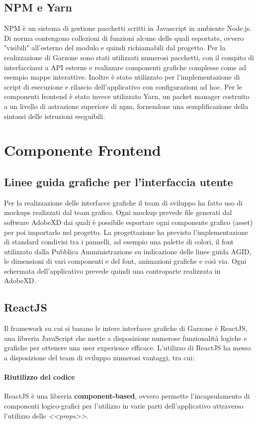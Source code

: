 \subsection{NPM e Yarn}
NPM è un sistema di gestione pacchetti scritti in Javascript in ambiente Node.js. Di norma contengono collezioni di funzioni alcune delle quali esportate, ovvero "visibili" all'esterno del modulo e quindi richiamabili dal progetto. Per la realizzazione di Garzone sono stati utilizzati numerosi pacchetti, con il compito di interfacciarsi a API esterne e realizzare componenti grafiche complesse come ad esempio mappe interattive. Inoltre è stato utilizzato per l'implementazione di script di esecuzione e rilascio dell'applicativo con configurazioni ad hoc. Per le componenti frontend è stato invece utilizzato Yarn, un packet manager costruito a un livello di astrazione superiore di npm, fornendone una semplificazione della sintassi delle istruzioni eseguibili.
\newpage
\section{Componente Frontend}
\subsection{Linee guida grafiche per l'interfaccia utente}
Per la realizzazione delle interfacce grafiche il team di sviluppo ha fatto uso di mockups realizzati dal team grafico. Ogni mockup prevede file generati dal software AdobeXD dai quali è possibile esportare ogni componente grafico (asset) per poi importarlo nel progetto. La progettazione ha previsto l'implementazione di standard condivisi tra i pannelli, ad esempio una palette di colori, il font utilizzato dalla Pubblica Amministrazione su indicazione delle linee guida AGID, le dimensioni di vari componenti e del font, animazioni grafiche e così via. Ogni schermata dell'applicativo prevede quindi una controparte realizzata in AdobeXD.
\subsection{ReactJS}
Il framework su cui si basano le intere interfacce grafiche di Garzone è ReactJS, una libreria JavaScript che mette a disposizione numerose funzionalità logiche e grafiche per ottenere una user experience efficace. L'utilizzo di ReactJS ha messo a disposizione del team di sviluppo numerosi vantaggi, tra cui:
\paragraph{Riutilizzo del codice} ReactJS è una libreria \textbf{component-based}, ovvero permette l'incapsulamento di componenti logico-grafici per l'utilizzo in varie parti dell'applicativo attraverso l'utilizzo delle \textit{<<props>>}.
